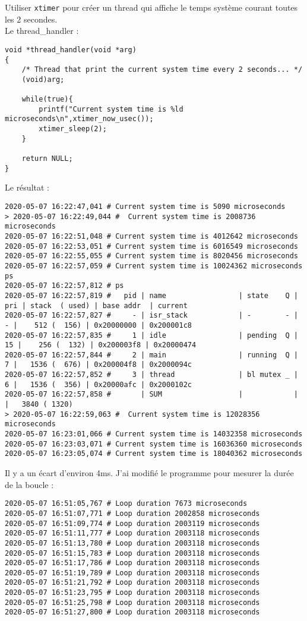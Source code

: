 Utiliser \texttt{xtimer} pour créer un thread qui affiche le temps
système courant toutes les 2 secondes.\\

Le thread\_handler :
\begin{lstlisting}
void *thread_handler(void *arg)
{
    /* Thread that print the current system time every 2 seconds... */
    (void)arg;
    
    while(true){
		printf("Current system time is %ld microseconds\n",xtimer_now_usec());
		xtimer_sleep(2);
	}
    
    return NULL;
}
\end{lstlisting}

Le résultat :
{\scriptsize
\begin{verbatim}
2020-05-07 16:22:47,041 # Current system time is 5090 microseconds
> 2020-05-07 16:22:49,044 #  Current system time is 2008736 microseconds
2020-05-07 16:22:51,048 # Current system time is 4012642 microseconds
2020-05-07 16:22:53,051 # Current system time is 6016549 microseconds
2020-05-07 16:22:55,055 # Current system time is 8020456 microseconds
2020-05-07 16:22:57,059 # Current system time is 10024362 microseconds
ps
2020-05-07 16:22:57,812 # ps
2020-05-07 16:22:57,819 # 	pid | name                 | state    Q | pri | stack  ( used) | base addr  | current     
2020-05-07 16:22:57,827 # 	  - | isr_stack            | -        - |   - |    512 (  156) | 0x20000000 | 0x200001c8
2020-05-07 16:22:57,835 # 	  1 | idle                 | pending  Q |  15 |    256 (  132) | 0x200003f8 | 0x20000474 
2020-05-07 16:22:57,844 # 	  2 | main                 | running  Q |   7 |   1536 (  676) | 0x200004f8 | 0x2000094c 
2020-05-07 16:22:57,852 # 	  3 | thread               | bl mutex _ |   6 |   1536 (  356) | 0x20000afc | 0x2000102c 
2020-05-07 16:22:57,858 # 	    | SUM                  |            |     |   3840 ( 1320)
> 2020-05-07 16:22:59,063 #  Current system time is 12028356 microseconds
2020-05-07 16:23:01,066 # Current system time is 14032358 microseconds
2020-05-07 16:23:03,071 # Current system time is 16036360 microseconds
2020-05-07 16:23:05,074 # Current system time is 18040362 microseconds
\end{verbatim}
}

Il y a un écart d'environ 4ms. J'ai modifié le programme pour mesurer
la durée de la boucle :
{\scriptsize
\begin{verbatim}
2020-05-07 16:51:05,767 # Loop duration 7673 microseconds
2020-05-07 16:51:07,771 # Loop duration 2002858 microseconds
2020-05-07 16:51:09,774 # Loop duration 2003119 microseconds
2020-05-07 16:51:11,777 # Loop duration 2003118 microseconds
2020-05-07 16:51:13,780 # Loop duration 2003118 microseconds
2020-05-07 16:51:15,783 # Loop duration 2003118 microseconds
2020-05-07 16:51:17,786 # Loop duration 2003118 microseconds
2020-05-07 16:51:19,789 # Loop duration 2003118 microseconds
2020-05-07 16:51:21,792 # Loop duration 2003118 microseconds
2020-05-07 16:51:23,795 # Loop duration 2003118 microseconds
2020-05-07 16:51:25,798 # Loop duration 2003118 microseconds
2020-05-07 16:51:27,800 # Loop duration 2003118 microseconds
\end{verbatim}
}

